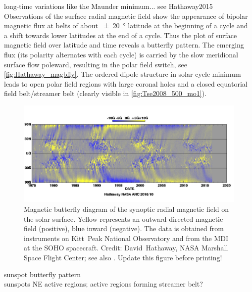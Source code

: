 long-time variations like the Maunder minimum... see Hathaway2015\\

Observations of the surface radial magnetic field show the appearance of bipolar magnetic flux at belts of about \SI{+-20}{\degree} latitude at the beginning of a cycle and a shift towards lower latitudes at the end of a cycle. Thus the plot of surface magnetic field over latitude and time reveals a butterfly pattern. The emerging flux (its polarity alternates with each cycle) is carried by the slow meridional surface flow poleward, resulting in the polar field switch, see \autoref{fig:Hathaway_magbfly}. The ordered dipole structure in solar cycle minimum leads to open polar field regions with large coronal holes and a closed equatorial field belt/streamer belt (clearly visible in \autoref{fig:Tse2008_500_mo1}).\\
\begin{figure}[htb]
	\centering
	\includegraphics[width=\textwidth]{images/Hathaway_magbfly_201610.jpg}
	\caption{Magnetic butterfly diagram of the synoptic radial magnetic field on the solar surface. Yellow represents an outward directed magnetic field (positive), blue inward (negative). The data is obtained from instruments on Kitt~Peak National Observatory and from the MDI at the SOHO spacecraft. Credit: David~Hathaway, NASA Marshall Space Flight Center; see also \citet[Fig.~17]{Hathaway2015}. Update this figure before printing!}
	\label{fig:Hathaway_magbfly}
\end{figure}

sunspot butterfly pattern \citep{Maunder1904}\\

sunspots NE active regions; active regions forming streamer belt?\\

